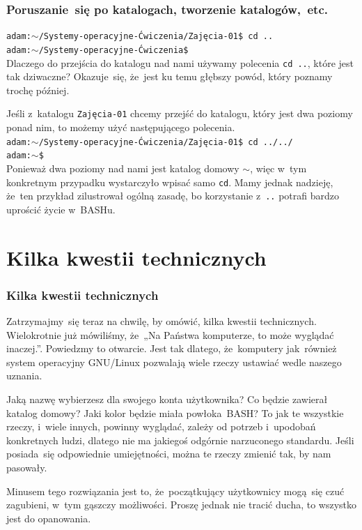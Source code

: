 \documentclass[10pt,t]{beamer}
\begin{document}
\begin{frame}
  \frametitle{Poruszanie~się po katalogach, tworzenie
    katalogów,~etc.}


  \texttt{adam:$\sim$/Systemy-operacyjne-Ćwiczenia/Zajęcia-01\$ cd ..} \\
  \texttt{adam:$\sim$/Systemy-operacyjne-Ćwiczenia\$} \\
  Dlaczego do przejścia do katalogu nad nami używamy polecenia
  \texttt{cd ..}, które jest tak dziwaczne? Okazuje~się, że~jest ku temu
  głębszy powód, który poznamy trochę później.

  Jeśli z~katalogu \texttt{Zajęcia-01} chcemy przejść do katalogu, który
  jest dwa poziomy ponad nim, to możemy użyć następującego polecenia. \\
  \texttt{adam:$\sim$/Systemy-operacyjne-Ćwiczenia/Zajęcia-01\$ cd ../../} \\
  \texttt{adam:$\sim$\$} \\
  Ponieważ dwa poziomy nad nami jest katalog domowy \texttt{$\sim$}, więc
  w~tym konkretnym przypadku wystarczyło wpisać samo \texttt{cd}.
  Mamy jednak nadzieję, że~ten przykład zilustrował ogólną zasadę,
  bo korzystanie z~\texttt{..} potrafi bardzo uprościć życie w~BASHu.

\end{frame}










\section{Kilka kwestii technicznych}


\begin{frame}
  \frametitle{Kilka kwestii technicznych}


  Zatrzymajmy~się teraz na chwilę, by omówić, kilka kwestii technicznych.
  Wielokrotnie już mówiliśmy, że~„Na Państwa komputerze, to może wyglądać
  inaczej.”. Powiedzmy to otwarcie. Jest tak dlatego, że~komputery
  jak~również system operacyjny GNU/Linux pozwalają wiele rzeczy ustawiać
  wedle naszego uznania.

  Jaką nazwę wybierzesz dla swojego konta użytkownika? Co będzie zawierał
  katalog domowy? Jaki kolor będzie miała powłoka~BASH? To jak te wszystkie
  rzeczy, i~wiele innych, powinny wyglądać, zależy od potrzeb
  i~upodobań konkretnych ludzi, dlatego nie ma jakiegoś odgórnie
  narzuconego standardu. Jeśli posiada~się odpowiednie umiejętności,
  można te rzeczy zmienić tak, by nam pasowały.

  Minusem tego rozwiązania jest to, że~początkujący użytkownicy mogą~się
  czuć zagubieni, w~tym gąszczy możliwości. Proszę jednak nie tracić ducha,
  to wszystko jest do opanowania.

\end{frame}
\end{document}
